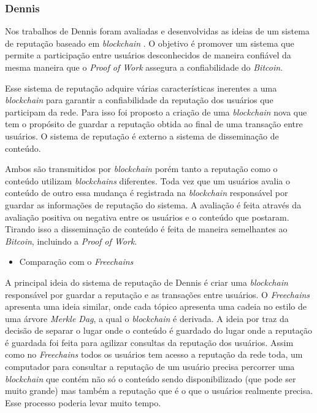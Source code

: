 \documentclass[12pt]{article}
\newcommand{\FC} {\textit{Freechains}\xspace}
\begin{document}
\subsubsection{Dennis} \label{subsub:dennis}

Nos trabalhos de Dennis foram avaliadas e desenvolvidas as ideias de um sistema de reputação baseado em \textit{blockchain} \cite{dennis2015rep} \cite{dennis2016rep}.
O objetivo é promover um sistema que permite a participação entre usuários desconhecidos de maneira confiável da mesma maneira que o \textit{Proof of Work} assegura a confiabilidade do \textit{Bitcoin}. 

Esse sistema de reputação adquire várias características inerentes a uma \textit{blockchain} para garantir a confiabilidade da reputação dos usuários que participam da rede. 
Para isso foi proposto a criação de uma \textit{blockchain} nova que tem o propósito de guardar a reputação obtida ao final de uma transação entre usuários.
O sistema de reputação é externo a sistema de disseminação de conteúdo.

Ambos são transmitidos por \textit{blockchain} porém tanto a reputação como o conteúdo utilizam \textit{blockchains} diferentes.
Toda vez que um usuários avalia o conteúdo de outro essa mudança é registrada na \textit{blockchain} responsável por guardar as informações de reputação do sistema.
A avaliação é feita através da avaliação positiva ou negativa entre os usuários e o conteúdo que postaram.
Tirando isso a disseminação de conteúdo é feita de maneira semelhantes ao \textit{Bitcoin}, incluindo a \textit{Proof of Work}.

\begin{itemize}
    \item Comparação com o \FC
\end{itemize}

A principal ideia do sistema de reputação de Dennis é criar uma \textit{blockchain} responsável por guardar a reputação e as transações entre usuários. 
O \FC apresenta uma ideia similar, onde cada tópico apresenta uma cadeia no estilo de uma árvore \textit{Merkle Dag}, a qual o \textit{blockchain} é derivada.
A ideia por traz da decisão de separar o lugar onde o conteúdo é guardado do lugar onde a reputação é guardada foi feita para agilizar consultas da reputação dos usuários.
Assim como no \FC todos os usuários tem acesso a reputação da rede toda, um computador para consultar a reputação de um usuário precisa percorrer uma \textit{blockchain} que contém não só o conteúdo sendo disponibilizado (que pode ser muito grande) mas também a reputação que é o que o usuários realmente precisa.
Esse processo poderia levar muito tempo.
\end{document}
